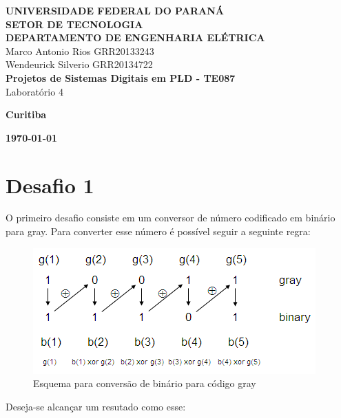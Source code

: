 \documentclass[12pt]{article}
\begin{document}
    
\begin{titlepage}
 \vfill
  \begin{center}
   {\large \textbf{UNIVERSIDADE FEDERAL DO PARANÁ \\ SETOR DE TECNOLOGIA \\ DEPARTAMENTO DE ENGENHARIA ELÉTRICA}} \\[5cm]

  {\large {Marco Antonio Rios  GRR20133243 \\ Wendeurick Silverio GRR20134722} }\\[4cm]


   {\Large \textbf{Projetos de Sistemas Digitais em PLD - TE087} \\ Laboratório 4}\\[6cm]
    \vfill

    \vspace{2cm}

    \large \textbf{Curitiba}

    \large \textbf{\today}

      \end{center}
\end{titlepage}

\clearpage

\section{Desafio 1}

O primeiro desafio consiste em um conversor de número codificado em binário para gray. Para converter esse número é possível seguir a seguinte regra:

\begin{figure}[!h]
    \centering
    \includegraphics[width=.6\textwidth]{btg.png}
    \caption{Esquema para conversão de binário para código gray}
    \label{fig:btg}
\end{figure}

Deseja-se alcançar um resutado como esse:
\end{document}
